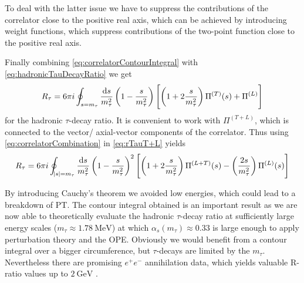 \documentclass[../../index.tex]{subfiles}
\begin{document}
To deal with the latter issue we have to suppress the contributions of the
correlator close to the positive real axis, which can be achieved by introducing
weight functions, which suppress contributions of the two-point function close
to the positive real axis.

Finally combining \cref{eq:correlatorContourIntegral} with
\cref{eq:hadronicTauDecayRatio} we get
\begin{equation}
  \label{eq:rTauT+L}
  R_\tau = 6 \pi i \oint_{s=m_\tau} \frac{\dif s}{m_\tau^2}
  \left( 1 - \frac{s}{m_\tau^2} \right)
  \left[ \left( 1 + 2 \frac{s}{m_\tau^2} \right) \Pi^{(T)}(s) + \Pi^{(L)} \right]
\end{equation}
for the hadronic $\tau$-decay ratio. It is convenient to work with
$\Pi^{(T+L)}$, which is connected to the vector/ axial-vector components of the
correlator. Thus using \cref{eq:correlatorCombination} in \cref{eq:rTauT+L} yields
\begin{equation}
  R_\tau = 6 \pi i \oint_{\abs{s}=m_\tau} \frac{\dif s}{m_\tau^2} \left( 1 - \frac{s}{m_\tau^2} \right)^2 \left[ \left( 1 + 2 \frac{s}{m_\tau^2} \right) \Pi^{(L+T)}(s) - \left( \frac{2 s}{m_\tau^2} \right) \Pi^{(L)}(s) \right]
\end{equation}

By introducing Cauchy's theorem we avoided low energies, which could lead to a
breakdown of PT. The contour integral obtained is an important result as we are
now able to theoretically evaluate the hadronic $\tau$-decay ratio at
sufficiently large energy scales ($m_\tau \approx \SI{1.78}{\mega\eV}$)
at which $\alpha_s(m_\tau)\approx 0.33$ \cite{Pich2016} is large enough to
apply perturbation theory and the OPE. Obviously we would benefit from a
contour integral over a bigger circumference, but $\tau$-decays are limited by the $m_\tau$.
Nevertheless there are promising $e^+e^-$ annihilation data, which yields
valuable R-ratio values up to $\SI{2}{\giga\electronvolt}$
\cite{Boito2018}\cite{Keshavarzi2018}.
\end{document}
